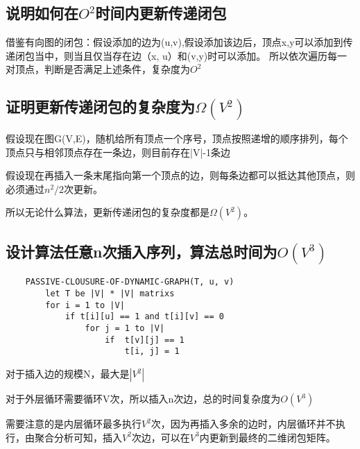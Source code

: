 \documentclass[UTF8]{ctexart}
\begin{document}
\subsection{说明如何在${O^2}$时间内更新传递闭包}

借鉴有向图的闭包：假设添加的边为(u,v),假设添加该边后，顶点x,y可以添加到传递闭包当中，则当且仅当存在边（x, u）和(v,y)时可以添加。
所以依次遍历每一对顶点，判断是否满足上述条件，复杂度为${O^2}$


 \subsection{证明更新传递闭包的复杂度为$\Omega(V^2)$}

 假设现在图G(V,E)，随机给所有顶点一个序号，顶点按照递增的顺序排列，每个顶点只与相邻顶点存在一条边，则目前存在|V|-1条边

 假设现在再插入一条末尾指向第一个顶点的边，则每条边都可以抵达其他顶点，则必须通过$n^2 / 2$次更新。

 所以无论什么算法，更新传递闭包的复杂度都是$\Omega(V^2)$。

 \subsection{设计算法任意n次插入序列，算法总时间为$O(V^3)$}

 \begin{lstlisting}
    PASSIVE-CLOUSURE-OF-DYNAMIC-GRAPH(T, u, v)
        let T be |V| * |V| matrixs
        for i = 1 to |V|
            if t[i][u] == 1 and t[i][v] == 0
                for j = 1 to |V|
                    if  t[v][j] == 1 
                        t[i, j] = 1
 \end{lstlisting}

 对于插入边的规模N，最大是$|V^2|$

 对于外层循环需要循环V次，所以插入n次边，总的时间复杂度为$O(V^3)$

 需要注意的是内层循环最多执行$V^2$次，因为再插入多余的边时，内层循环并不执行，由聚合分析可知，插入$V^2$次边，可以在$V^3$内更新到最终的二维闭包矩阵。
\end{document}
